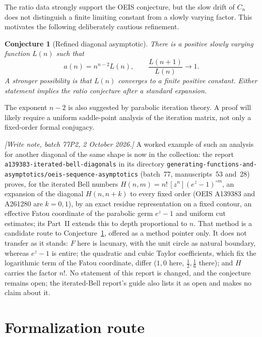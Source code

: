 \documentclass[11pt]{article}
\newtheorem{conjecture}[theorem]{Conjecture}
\theoremstyle{definition}
\theoremstyle{remark}
\begin{document}
The ratio data strongly support the OEIS conjecture, but the slow drift of
$C_n$ does not distinguish a finite limiting constant from a slowly varying
factor.  This motivates the following deliberately cautious refinement.

\begin{conjecture}[Refined diagonal asymptotic]
\label{lim:conj:refined-asymptotic}
There is a positive slowly varying function $L(n)$ such that
\[
  a(n)=n^{n-2}L(n),
  \qquad \frac{L(n+1)}{L(n)}\longrightarrow1.
\]
A stronger possibility is that $L(n)$ converges to a finite positive constant.
Either statement implies the ratio conjecture after a standard expansion.
\end{conjecture}

The exponent $n-2$ is also suggested by parabolic iteration theory.  A proof
will likely require a uniform saddle-point analysis of the iteration matrix,
not only a fixed-order formal conjugacy.

\emph{[Write note, batch 77P2, 2 October 2026.]} A worked example of such
an analysis for another diagonal of the same shape is now in the
collection: the report
\texttt{a139383-\allowbreak iterated-\allowbreak bell-\allowbreak diagonals}
in its directory
\texttt{generating-\allowbreak functions-\allowbreak and-\allowbreak asymptotics/\allowbreak oeis-\allowbreak sequence-\allowbreak asymptotics}
(batch~77, manuscripts~53 and~28) proves, for the iterated Bell numbers
$H(n,m)=n!\,[z^n](e^z-1)^{\circ m}$, an expansion of the diagonal
$H(n,n+k)$ to every fixed order (OEIS A139383 and A261280 are $k=0,1$),
by an exact residue representation on a fixed contour, an effective Fatou
coordinate of the parabolic germ $e^z-1$ and uniform cut estimates; its
Part~II extends this to depth proportional to $n$. That method is a
candidate route to Conjecture~\ref{lim:conj:refined-asymptotic}, offered as a method
pointer only. It does not transfer as it stands: $F$ here is lacunary,
with the unit circle as natural boundary, whereas $e^z-1$ is entire; the
quadratic and cubic Taylor coefficients, which fix the logarithmic term of
the Fatou coordinate, differ ($1,0$ here, $\tfrac12,\tfrac16$ there); and
$H$ carries the factor $n!$. No statement of this report is changed, and the
conjecture remains open; the iterated-Bell report's guide also lists it as
open and makes no claim about it.

\section{Formalization route}
\end{document}
